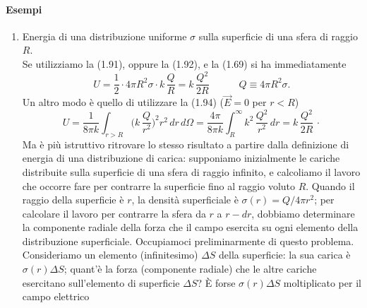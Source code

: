 \paragraph{Esempi}
\begin{enumerate}
\item Energia di una distribuzione uniforme $\sigma$ sulla superficie di una sfera di raggio $R$.\\
Se utilizziamo la (1.91), oppure la (1.92), e la (1.69) si ha immediatamente
\begin{equation}
U=\frac12\cdot4\pi R^2\sigma\cdot k\,\frac QR=k\,\frac{Q^2}{2R}\qquad\quad Q\equiv4\pi R^2\sigma.
\tag{1.95}
\end{equation}
Un altro modo è quello di utilizzare la (1.94) ($\vec E=0$ per $r<R$)
\[
U=\frac{1}{8\pi k}\int_{r>R}\Big(k\,\frac{Q}{r^2}\Big)^2r^2\,dr\,d\Omega=\frac{4\pi}{8\pi k}\int_R^\infty k^2\,\frac{Q^2}{r^2}\,dr=k\,\frac{Q^2}{2R}\,\cdot
\]
Ma è più istruttivo ritrovare lo stesso risultato a partire dalla definizione di energia di una distribuzione di carica: supponiamo inizialmente le cariche distribuite sulla superficie di una sfera di raggio infinito, e calcoliamo il lavoro che occorre fare per contrarre la superficie fino al raggio voluto $R$. Quando il raggio della superficie è $r$, la densità superficiale è $\sigma(r)=Q/4\pi r^2$; per calcolare il lavoro per contrarre la sfera da $r$ a $r-dr$, dobbiamo determinare la componente radiale della forza che il campo esercita su ogni elemento della distribuzione superficiale. Occupiamoci preliminarmente di questo problema.\\
Consideriamo un elemento (infinitesimo) $\Delta S$ della superficie: la sua carica è $\sigma(r)\Delta S$; quant'è la forza (componente radiale) che le altre cariche esercitano sull'elemento di superficie $\Delta S$? È forse $\sigma(r)\Delta S$ moltiplicato per il campo elettrico

\end{enumerate}
